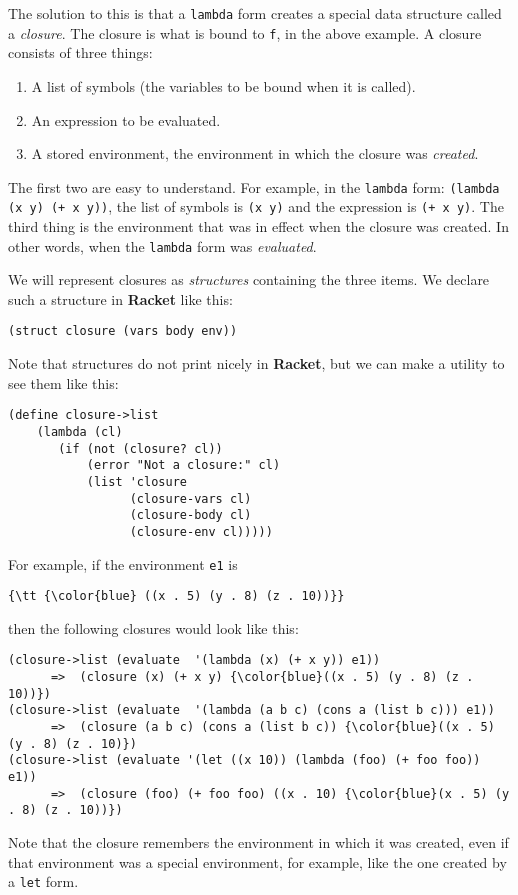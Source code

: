 \documentclass{article}
\begin{document}
The solution to this is that a {\tt lambda} form creates a special
data structure called a {\em  closure}.  The closure is what is bound
to {\tt f}, in the above example.
A closure consists of three things:
\begin{enumerate}
\item A list of symbols (the variables to be bound when it is called).
\item An expression to be evaluated.
\item A stored environment, the environment in which the closure was
  {\em created}.
\end{enumerate}
The first two are easy to understand.  For example, in the {\tt lambda}
form: {\tt (lambda (x y) (+ x y))}, the list of symbols is {\tt (x y)}
and the expression is {\tt (+ x y)}.  The third thing is 
the environment that was in effect when the closure was created.  In
other words, when the {\tt lambda} form was {\em evaluated}.

We will represent closures as {\em structures} containing the
three items.  We declare such a structure in {\bf Racket} like this:
\begin{Verbatim}[frame=single]
  (struct closure (vars body env))
\end{Verbatim}
Note that structures do not print nicely in {\bf Racket}, but
we can make a utility to see them like this:
\begin{Verbatim}[frame=single]
  (define closure->list
    (lambda (cl)
       (if (not (closure? cl))
           (error "Not a closure:" cl)
           (list 'closure
                 (closure-vars cl)
                 (closure-body cl)
                 (closure-env cl)))))
\end{Verbatim}
For example, if the environment {\tt e1}
is
\begin{Verbatim}[commandchars=\\\{\}]
  {\tt {\color{blue} ((x . 5) (y . 8) (z . 10))}}
\end{Verbatim}
then the following closures would look like this:
\begin{Verbatim}[frame=single,commandchars=\\\{\}]
(closure->list (evaluate  '(lambda (x) (+ x y)) e1))
      =>  (closure (x) (+ x y) {\color{blue}((x . 5) (y . 8) (z . 10))})
(closure->list (evaluate  '(lambda (a b c) (cons a (list b c))) e1))
      =>  (closure (a b c) (cons a (list b c)) {\color{blue}((x . 5) (y . 8) (z . 10)})
(closure->list (evaluate '(let ((x 10)) (lambda (foo) (+ foo foo)) e1))
      =>  (closure (foo) (+ foo foo) ((x . 10) {\color{blue}(x . 5) (y . 8) (z . 10))})
\end{Verbatim}
Note that the closure remembers the environment in which it was
created, even if that environment was a special environment, for
example, like the one created by a {\tt let} form.
\end{document}
